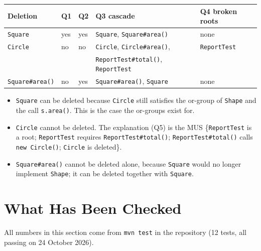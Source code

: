 \documentclass[11pt,a4paper]{article}
\newcommand{\code}[1]{\texttt{#1}}
\begin{document}
\begin{center}
\begin{tabular}{@{}lllll@{}}
\toprule
Deletion & Q1 & Q2 & Q3 cascade & Q4 broken roots \\
\midrule
\code{Square} & yes & yes & \code{Square}, \code{Square\#area()} & none \\
\code{Circle} & no & no & \code{Circle}, \code{Circle\#area()}, & \code{ReportTest} \\
 & & & \code{ReportTest\#total()}, \code{ReportTest} & \\
\code{Square\#area()} & no & yes & \code{Square\#area()}, \code{Square} & none \\
\bottomrule
\end{tabular}
\end{center}

\begin{itemize}
  \item \code{Square} can be deleted because \code{Circle} still satisfies
        the or-group of \code{Shape} and the call \code{s.area()}. This is
        the case the or-groups exist for.
  \item \code{Circle} cannot be deleted. The explanation (Q5) is the MUS
        \{\code{ReportTest} is a root; \code{ReportTest} requires
        \code{ReportTest\#total()}; \code{ReportTest\#total()} calls
        \code{new Circle()}; \code{Circle} is deleted\}.
  \item \code{Square\#area()} cannot be deleted alone, because
        \code{Square} would no longer implement \code{Shape}; it can be
        deleted together with \code{Square}.
\end{itemize}

\section{What Has Been Checked}\label{sec:checked}

All numbers in this section come from \code{mvn test} in the repository
(12 tests, all passing on 24 October 2026).
\end{document}
